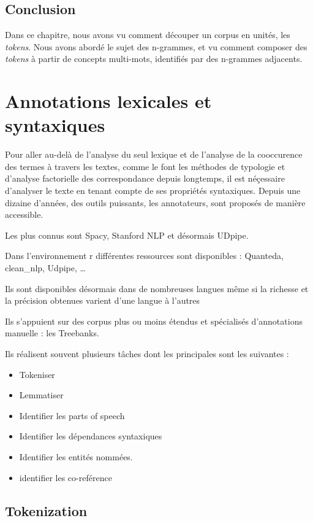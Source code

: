 \documentclass[
]{book}
\providecommand{\tightlist}{%
  \setlength{\itemsep}{0pt}\setlength{\parskip}{0pt}}
\begin{document}
\hypertarget{conclusion-3}{%
\section{Conclusion}\label{conclusion-3}}

Dans ce chapitre, nous avons vu comment découper un corpus en unités, les \emph{tokens}. Nous avons abordé le sujet des n-grammes, et vu comment composer des \emph{tokens} à partir de concepts multi-mots, identifiés par des n-grammes adjacents.

\hypertarget{annot}{%
\chapter{Annotations lexicales et syntaxiques}\label{annot}}

Pour aller au-delà de l'analyse du seul lexique et de l'analyse de la cooccurence des termes à travers les textes, comme le font les méthodes de typologie et d'analyse factorielle des correspondance depuis longtemps, il est néçessaire d'analyser le texte en tenant compte de ses propriétés syntaxiques. Depuis une dizaine d'années, des outils puissants, les annotateurs, sont proposés de manière accessible.

Les plus connus sont Spacy, Stanford NLP et désormais UDpipe.

Dans l'environnement r différentes ressources sont disponibles : Quanteda, clean\_nlp, Udpipe, \ldots{}

Ils sont disponibles désormais dans de nombreuses langues même si la richesse et la précision obtenues varient d'une langue à l'autres

Ils s'appuient sur des corpus plus ou moins étendus et spécialisés d'annotations manuelle : les Treebanks.

Ils réalisent souvent plusieurs tâches dont les principales sont les suivantes :

\begin{itemize}
\tightlist
\item
  Tokeniser
\item
  Lemmatiser
\item
  Identifier les parts of speech
\item
  Identifier les dépendances syntaxiques
\item
  Identifier les entités nommées.
\item
  identifier les co-reférence
\end{itemize}

\hypertarget{tokenization}{%
\section{Tokenization}\label{tokenization}}
\end{document}
